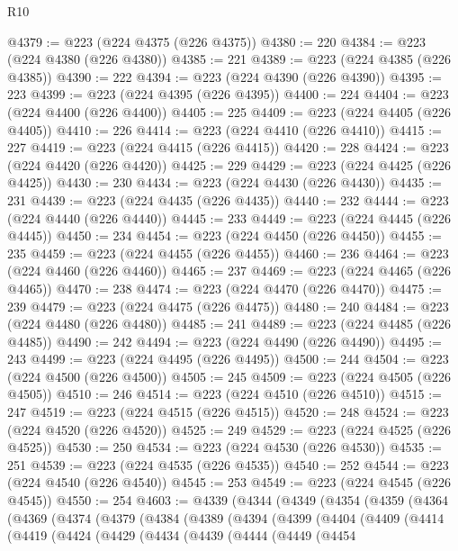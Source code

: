 \begin{lexlean}{R10}
\begin{coremodule}
{{{{{{{{{{{{{{{{{{{{{{{{{{{{{{{{{{{{{{{{{{{{{{{{{{{{{{{{{{{{{{{{{{{{{{{{{{{{{{{{{{{{@4379 := @223 (@224 @4375 (@226 @4375))
@4380 := 220
@4384 := @223 (@224 @4380 (@226 @4380))
@4385 := 221
@4389 := @223 (@224 @4385 (@226 @4385))
@4390 := 222
@4394 := @223 (@224 @4390 (@226 @4390))
@4395 := 223
@4399 := @223 (@224 @4395 (@226 @4395))
@4400 := 224
@4404 := @223 (@224 @4400 (@226 @4400))
@4405 := 225
@4409 := @223 (@224 @4405 (@226 @4405))
@4410 := 226
@4414 := @223 (@224 @4410 (@226 @4410))
@4415 := 227
@4419 := @223 (@224 @4415 (@226 @4415))
@4420 := 228
@4424 := @223 (@224 @4420 (@226 @4420))
@4425 := 229
@4429 := @223 (@224 @4425 (@226 @4425))
@4430 := 230
@4434 := @223 (@224 @4430 (@226 @4430))
@4435 := 231
@4439 := @223 (@224 @4435 (@226 @4435))
@4440 := 232
@4444 := @223 (@224 @4440 (@226 @4440))
@4445 := 233
@4449 := @223 (@224 @4445 (@226 @4445))
@4450 := 234
@4454 := @223 (@224 @4450 (@226 @4450))
@4455 := 235
@4459 := @223 (@224 @4455 (@226 @4455))
@4460 := 236
@4464 := @223 (@224 @4460 (@226 @4460))
@4465 := 237
@4469 := @223 (@224 @4465 (@226 @4465))
@4470 := 238
@4474 := @223 (@224 @4470 (@226 @4470))
@4475 := 239
@4479 := @223 (@224 @4475 (@226 @4475))
@4480 := 240
@4484 := @223 (@224 @4480 (@226 @4480))
@4485 := 241
@4489 := @223 (@224 @4485 (@226 @4485))
@4490 := 242
@4494 := @223 (@224 @4490 (@226 @4490))
@4495 := 243
@4499 := @223 (@224 @4495 (@226 @4495))
@4500 := 244
@4504 := @223 (@224 @4500 (@226 @4500))
@4505 := 245
@4509 := @223 (@224 @4505 (@226 @4505))
@4510 := 246
@4514 := @223 (@224 @4510 (@226 @4510))
@4515 := 247
@4519 := @223 (@224 @4515 (@226 @4515))
@4520 := 248
@4524 := @223 (@224 @4520 (@226 @4520))
@4525 := 249
@4529 := @223 (@224 @4525 (@226 @4525))
@4530 := 250
@4534 := @223 (@224 @4530 (@226 @4530))
@4535 := 251
@4539 := @223 (@224 @4535 (@226 @4535))
@4540 := 252
@4544 := @223 (@224 @4540 (@226 @4540))
@4545 := 253
@4549 := @223 (@224 @4545 (@226 @4545))
@4550 := 254
@4603 := @4339
    (@4344
      (@4349
        (@4354
          (@4359
            (@4364
              (@4369
                (@4374
                  (@4379
                    (@4384
                      (@4389
                        (@4394
                          (@4399
                            (@4404
                              (@4409
                                (@4414
                                  (@4419
                                    (@4424
                                      (@4429
                                        (@4434
                                          (@4439
                                            (@4444
                                              (@4449
                                                (@4454
}}}}}}}}}}}}}}}}}}}}}}}}}}}}}}}}}}}}}}}}}}}}}}}}}}}}}}}}}}}}}}}}}}}}}}}}}}}}}}}}}}}}
\end{coremodule}
\end{lexlean}
